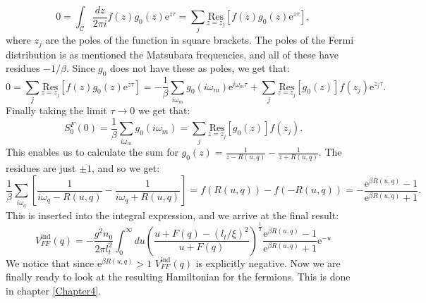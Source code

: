 \begin{equation}
0 = \int_\mathcal{C} \frac{dz}{2\pi i} f(z)g_0(z)\text{e}^{z\tau} = \sum_j \underset{z=z_j}{\text{Res}}[f(z)g_0(z)\text{e}^{z\tau}], \nonumber
\end{equation}
where $z_j$ are the poles of the function in square brackets. The poles of the Fermi distribution is as mentioned the Matsubara frequencies, and all of these have residues $-1/\beta$. Since $g_0$ does not have these as poles, we get that:
\begin{equation}
0 = \sum_j \underset{z=z_j}{\text{Res}}[f(z)g_0(z)\text{e}^{z\tau}] = -\frac{1}{\beta}\sum_{i\omega_m}g_0(i\omega_m)\text{e}^{i\omega_m\tau} + \sum_j \underset{z=z_j}{\text{Res}}[g_0(z)]f(z_j)\text{e}^{z_j\tau}. \nonumber
\end{equation}
Finally taking the limit $\tau \to 0$ we get that:
\begin{equation}
S^F_0(0)=\frac{1}{\beta}\sum_{i\omega_m}g_0(i\omega_m) = \sum_j \underset{z=z_j}{\text{Res}}[g_0(z)]f(z_j).
\label{eq.FermionMatsubaraSum}
\end{equation}
This enables us to calculate the sum for $g_0(z) = \frac{1}{z-R(u,q)}-\frac{1}{z+R(u,q)}$. The residues are just $\pm 1$, and so we get:
\begin{equation}
\frac{1}{\beta}\sum_{i\omega_q}\left[\frac{1}{i\omega_q-R(u,q)}-\frac{1}{i\omega_q+R(u,q)}\right] = f(R(u,q))-f(-R(u,q)) = -\frac{\text{e}^{\beta R(u,q)}-1}{\text{e}^{\beta R(u,q)}+1}. \nonumber
\end{equation}
This is inserted into the integral expression, and we arrive at the final result:
\begin{equation}
V^\text{ind}_{FF}(q) = -\frac{g^2n_0}{2\pi l_t^2}\int_0^\infty du \left(\frac{u+F(q)-\left(l_t/\xi\right)^2}{u+F(q)}\right)^{\frac{1}{2}}\frac{\text{e}^{\beta R(u,q)}-1}{\text{e}^{\beta R(u,q)}+1}
\text{e}^{-u}
\label{eq.VFFq}
\end{equation}
We notice that since $\text{e}^{\beta R(u,q)} > 1$ $V^\text{ind}_{FF}(q)$ is explicitly negative. Now we are finally ready to look at the resulting Hamiltonian for the fermions. This is done in chapter \ref{Chapter4}.







